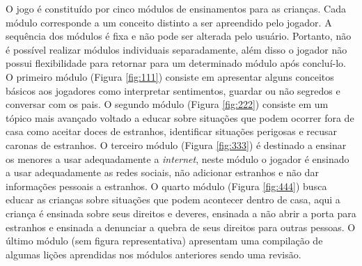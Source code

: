 O jogo é constituído por cinco módulos de ensinamentos para as crianças. Cada módulo corresponde a um conceito distinto a ser apreendido pelo jogador. A sequência dos módulos é fixa e não pode ser alterada pelo usuário. Portanto, não é possível realizar módulos individuais separadamente, além disso o jogador não possui flexibilidade para retornar para um determinado módulo após concluí-lo. O primeiro módulo (Figura \ref{fig:111}) consiste em apresentar alguns conceitos básicos aos jogadores como interpretar sentimentos, guardar ou não segredos e conversar com os pais. O segundo módulo (Figura \ref{fig:222}) consiste em um tópico mais avançado voltado a educar sobre situações que podem ocorrer fora de casa como aceitar doces de estranhos, identificar situações perigosas e recusar caronas de estranhos. O terceiro módulo (Figura \ref{fig:333}) é destinado a ensinar os menores a usar adequadamente a \textit{internet}, neste módulo o jogador é ensinado a usar adequadamente as redes sociais, não adicionar estranhos e não dar informações pessoais a estranhos. O quarto módulo (Figura \ref{fig:444}) busca educar as crianças sobre situações que podem acontecer dentro de casa, aqui a criança é ensinada sobre seus direitos e deveres, ensinada a não abrir a porta para estranhos e ensinada a denunciar a quebra de seus direitos para outras pessoas. O último módulo (sem figura representativa) apresentam uma compilação de algumas lições aprendidas nos módulos anteriores sendo uma revisão.%

